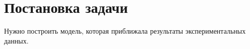 \section{Постановка задачи}
Нужно построить модель, которая приближала результаты экспериментальных данных.
